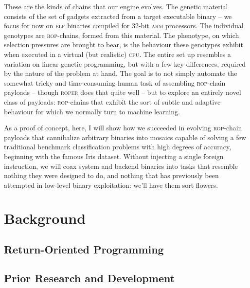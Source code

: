 These are the kinds of chains that our engine evolves. The
genetic material consists of the set of gadgets extracted from
a target executable binary -- we focus for now on \textsc{elf}
binaries compiled for 32-bit \textsc{arm} processors. The
individual genotypes are \textsc{rop}-chains, formed from this
material. The phenotype, on which selection pressures are brought
to bear, is the behaviour these genotypes exhibit when executed
in a virtual (but realistic) \textsc{cpu}. The entire set up
resembles a variation on linear genetic programming, but with a
few key differences, required by the nature of the problem at
hand. The goal is to not simply automate the somewhat tricky and
time-consuming human task of assembling \textsc{rop}-chain
payloads -- though \textsc{roper} does that quite well -- but to
explore an entirely novel class of payloads: \textsc{rop}-chains
that exhibit the sort of subtle and adaptive behaviour for which
we normally turn to machine learning. 

As a proof of concept, here, I will show how we succeeded in
evolving \textsc{rop}-chain payloads that cannibalize arbitrary
binaries into mosaics capable of solving a few traditional
benchmark classification problems with high degrees of accuracy,
beginning with the famous Iris dataset. Without injecting a
single foreign instruction, we will coax system and backend
binaries into tasks that resemble nothing they were designed to
do, and nothing that has previously been attempted in low-level
binary exploitation: we'll have them sort flowers.
\section{Background}

\subsection{Return-Oriented Programming}

\subsection{Prior Research and Development}


